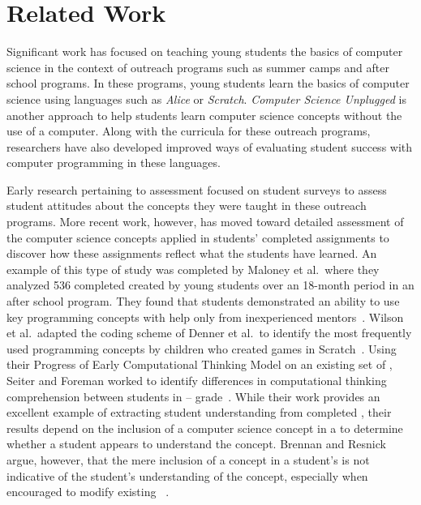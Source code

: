 \section{Related Work}
Significant work has focused on teaching young students the basics of computer
science in the context of outreach programs such as summer camps and after
school programs. In these programs, young students learn the basics of computer
science using languages such as \emph{Alice} or \emph{Scratch}. \emph{Computer
  Science Unplugged} is another approach to help students learn computer
science concepts without the use of a computer. Along with the curricula for
these outreach programs, researchers have also developed improved ways of
evaluating student success with computer programming in these languages.

Early research pertaining to assessment focused on student surveys to assess
student attitudes about the concepts they were taught in these outreach
programs. More recent work, however, has moved toward detailed assessment of
the computer science concepts applied in students' completed assignments to
discover how these assignments reflect what the students have learned. An
example of this type of study was completed by Maloney et al.\, where they
analyzed 536 completed  created by young students over an 18-month
period in an after school program. They found that students demonstrated an
ability to use key programming concepts with help only from inexperienced
mentors~\cite{Maloney:2008:PCU:1352135.1352260}. Wilson et al.\ adapted the
coding scheme of Denner et al.\ to identify the most frequently used
programming concepts by children who created games in
Scratch~\cite{Denner:2012:CGC:2072695.2073050, wilson12}. Using their Progress
of Early Computational Thinking Model on an existing set of ,
Seiter and Foreman worked to identify differences in computational thinking
comprehension between students in --
grade~\cite{Seiter:2013:MLP:2493394.2493403}. While their work provides an
excellent example of extracting student understanding from completed
, their results depend on the inclusion of a computer science
concept in a \sprogram{} to determine whether a student appears to understand
the concept. Brennan and Resnick argue, however, that the mere inclusion of a
concept in a student's \sprogram{} is not indicative of the student's
understanding of the concept, especially when encouraged to modify existing
~\cite{brennan12}.


